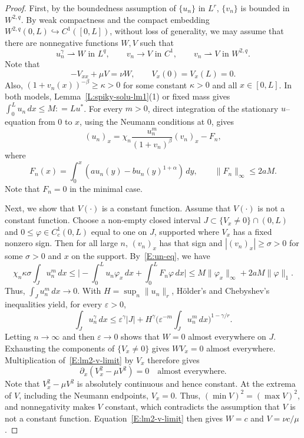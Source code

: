 \documentclass[11pt]{article} %
\theoremstyle{remark}
\theoremstyle{remark}
\numberwithin{equation}{section}
\numberwithin{figure}{section}
\numberwithin{table}{section}
\begin{document}
\begin{proof}
  First, by the boundedness assumption of $\{u_n\}$ in $L^r$, $\{v_n\}$ is
  bounded in $W^{2,q}$. By weak compactness and the compact embedding
  $W^{2,q}(0,L)\hookrightarrow C^1([0, L])$, without loss of generality, we may
  assume that there are nonnegative functions $W, V$ such that
  \[
    u_{n}^\gamma\rightharpoonup W\text{ in }L^q,
    \qquad v_{n}\to V\text{ in }C^1,
    \qquad v_{n}\rightharpoonup V\text{ in }W^{2,q}.
  \]
  Note that
  \begin{equation}\label{E:lm2-v-limit}
    -V_{xx}+\mu V=\nu W,\qquad V_x(0)=V_x(L)=0.
  \end{equation}
  Also, $(1 + v_n(x))^{-\beta} \ge \kappa > 0$ for some constant $\kappa > 0$
  and all $x \in [0, L]$. In both models, Lemma~\ref{L:spiky-solu-lm1}(1) or
  fixed mass gives $\int_0^L u_n\,dx \le M: = Lu^*$. For every $m > 0$, direct
  integration of the stationary $u$--equation from $0$ to $x$, using the Neumann
  conditions at $0$, gives
  \begin{equation}\label{E:un-eq}
    (u_n)_x=\chi_n\frac{u_n^m}{(1+v_n)^\beta}(v_n)_x-F_n,
  \end{equation}
  where
  \[
    F_n(x)=\int_0^x\left(au_n(y)-bu_n(y)^{1+\alpha}\right)\,dy,
    \qquad \|F_n\|_\infty\le2aM.
  \]
  Note that $F_n = 0$ in the minimal case.


  Next, we show that $V(\cdot)$ is a constant function. Assume that $V(\cdot)$
  is not a constant function. Choose a non-empty closed interval $J \subset
  \{V_x \ne 0\}\cap(0, L)$ and $0 \le \varphi \in C_c^1(0,L)$ equal to one on
  $J$, supported where $V_x$ has a fixed nonzero sign. Then for all large $n$,
  $(v_{n})_x$ has that sign and $|(v_{n})_x| \ge \sigma > 0$ for some $\sigma >
  0$ and $x$ on the support. By~\eqref{E:un-eq}, we have
  \[
    \chi_n\kappa\sigma\int_Ju_n^m\,dx
    \le\Big|-\int_0^L u_n\varphi_x\,dx+\int_0^L F_n\varphi\,dx\Big|
    \le M\|\varphi_x\|_\infty+2aM\|\varphi\|_1.
  \]
  Thus, $\int_Ju_n^m\,dx \to 0$. With $H = \sup_n\|u_n\|_r$, H\"older's and
  Chebyshev's inequalities yield, for every $\varepsilon > 0$,
  \[
    \int_Ju_n^\gamma\,dx
    \le\varepsilon^\gamma|J|
    + H^\gamma\Big(\varepsilon^{-m}\int_Ju_n^m\,dx\Big)^{1-\gamma/r}.
  \]
  Letting $n \to \infty$ and then $\varepsilon \to 0$ shows that $W = 0$ almost
  everywhere on $J$. Exhausting the components of $\{V_x \ne 0\}$ gives $WV_x =
  0$ almost everywhere. Multiplication of~\eqref{E:lm2-v-limit} by $V_x$
  therefore gives
  \[
    \partial_x(V_x^2-\mu V^2)=0\quad\text{almost everywhere}.
  \]
  Note that $V_x^2 - \mu V^2$ is absolutely continuous and hence constant. At
  the extrema of $V$, including the Neumann endpoints, $V_x = 0$. Thus, $(\min
  V)^2 = (\max V)^2$, and nonnegativity makes $V$ constant, which contradicts
  the assumption that $V$ is not a constant function.
  Equation~\eqref{E:lm2-v-limit} then gives $W = c$ and $V = \nu c/\mu$.
\end{proof}
\end{document}
